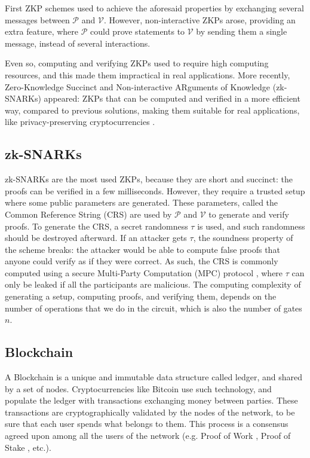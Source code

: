 First ZKP schemes used to achieve the aforesaid properties by exchanging several messages between $\mathcal{P}$ and $\mathcal{V}$. However, non-interactive ZKPs \cite{Blum:1988:NZA:62212.62222} arose, providing an extra feature, where $\mathcal{P}$ could prove statements to $\mathcal{V}$ by sending them a single message, instead of several interactions. 

Even so, computing and verifying ZKPs used to require high computing resources, and this made them impractical in real applications. More recently, Zero-Knowledge Succinct and Non-interactive ARguments of Knowledge (zk-SNARKs) \cite{cryptoeprint:2013:879} appeared: ZKPs that can be computed and verified in a more efficient way, compared to previous solutions, making them suitable for real applications, like privacy-preserving cryptocurrencies \cite{zcash}. 

\subsection{zk-SNARKs}

zk-SNARKs \cite{184425} are the most used ZKPs, because they are short and succinct: the proofs can be verified in a few milliseconds. However, they require a trusted setup where some public parameters are generated. These parameters, called the Common Reference String (CRS) are used by $\mathcal{P}$ and $\mathcal{V}$ to generate and verify proofs. To generate the CRS, a secret randomness $\tau$ is used, and such randomness should be destroyed afterward. If an attacker gets $\tau$, the soundness property of the scheme breaks: the attacker would be able to compute false proofs that anyone could verify as if they were correct. As such, the CRS is commonly computed using a secure Multi-Party Computation (MPC) protocol \cite{cryptoeprint:2017:1050}, where $\tau$ can only be leaked if all the participants are malicious. The computing complexity of generating a setup, computing proofs, and verifying them, depends on the number of operations that we do in the circuit, which is also the number of gates $n$. 

\subsection{Blockchain}

A Blockchain \cite{blockchain} is a unique and immutable data structure called ledger, and shared by a set of nodes. Cryptocurrencies like Bitcoin \cite{blockchain2} use such technology, and populate the ledger with transactions exchanging money between parties. These transactions are cryptographically validated by the nodes of the network, to be sure that each user spends what belongs to them. This process is a consensus agreed upon among all the users of the network (e.g. Proof of Work \cite{gervais2016security}, Proof of Stake \cite{bentov2014proof}, etc.). 

